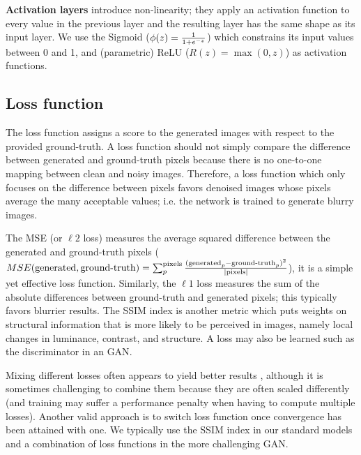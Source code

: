 \textbf{Activation layers} introduce non-linearity; they apply an activation function to every value in the previous layer and the resulting layer has the same shape as its input layer. We use the Sigmoid ($\phi(z)={1\over{1+e^{-z}}}$) which constrains its input values between 0 and 1, and (parametric) \ac{ReLU} ($R(z)=\max(0,z)$) as activation functions. 


\subsection{Loss function}
The loss function assigns a score to the generated images with respect to the provided ground-truth. A loss function should not simply compare the difference between generated and ground-truth pixels because there is no one-to-one mapping between clean and noisy images. Therefore, a loss function which only focuses on the difference between pixels favors denoised images whose pixels average the many acceptable values; i.e. the network is trained to generate blurry images. \cite{pix2pix}

The \ac{MSE} (or $\ell 2$ loss) measures the average squared difference between the generated and ground-truth pixels ($MSE(\text{generated}, \text{ground-truth})=\sum_p^\text{pixels}{(\text{generated}_p-\text{ground-truth}_p)^2\over{|\text{pixels}|}}$), it is a simple yet effective loss function. Similarly, the $\ell 1$ loss measures the sum of the absolute differences between ground-truth and generated pixels; this typically favors blurrier results. The \ac{SSIM} index is another metric which puts weights on structural information that is more likely to be perceived in images, namely local changes in luminance, contrast, and structure. A loss may also be learned such as the discriminator in an \acl{GAN}.

Mixing different losses often appears to yield better results \cite{lossescomp}, although it is sometimes challenging to combine them because they are often scaled differently (and training may suffer a performance penalty when having to compute multiple losses). Another valid approach is to switch loss function once convergence has been attained with one. \cite{lossescomp} We typically use the \ac{SSIM} index in our standard models and a combination of loss functions in the more challenging \ac{GAN}.

